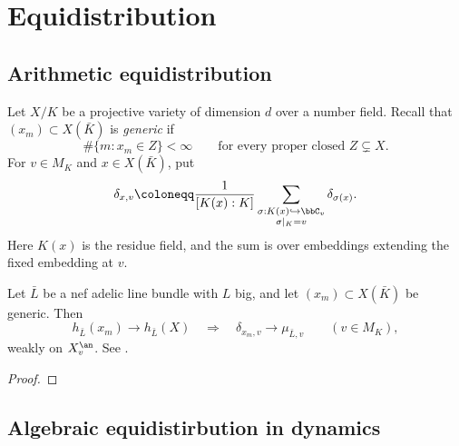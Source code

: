 \section{Equidistribution}





\subsection[status=draft,tag=0000000,label=\labelNFM{subsec:arithmetic-Equidistribution}]{Arithmetic equidistribution}


\Yang{}


Let $X/K$ be a projective variety of dimension $d$ over a number field.
Recall that $(x_m) \subset X(\bar K)$ is \emph{generic} if
\[ \#\{m:x_m \in Z\} < \infty \qquad\text{for every proper closed }Z \subsetneq X. \]
For $v \in M_K$ and $x \in X(\bar K)$, put
\[ \delta_{x,v} \coloneqq \frac{1}{[K(x):K]}\sum_{\substack{\sigma:K(x)\hookrightarrow\bbC_v\\\sigma|_K=v}}\delta_{\sigma(x)}. \]
Here $K(x)$ is the residue field, and the sum is over embeddings extending the fixed embedding at $v$.

\begin{theorem}[label=\labelNFM{thm:equidistribution-of-small-points}, status=draft, tag=0000000]
Let $\bar L$ be a nef adelic line bundle with $L$ big, and let $(x_m) \subset X(\bar K)$ be generic.
Then
\[ h_{\bar L}(x_m) \longrightarrow h_{\bar L}(X) \quad\Longrightarrow\quad \delta_{x_m,v} \longrightarrow \mu_{\bar L,v} \qquad(v \in M_K), \]
weakly on $X_v^\an$.
See \cite[Theorem~5.4.3]{Yuan-Zhang-2026-AdelicLineBundles}.
\end{theorem}
\begin{proof}
\Yang{}
\end{proof}



























\subsection[status=draft,tag=0000000,label=\labelNFM{subsec:algebraic-Equidistribution}]{Algebraic equidistirbution in dynamics}



